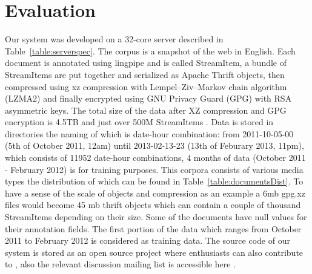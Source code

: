 
\section{Evaluation}
\label{sec:results}

 Our system was developed on a 32-core server described in Table~\ref{table:serverspec}. The corpus is a snapshot of the web in English. Each document is annotated using lingpipe and is called StreamItem, a bundle of StreamItems are put together and serialized as Apache Thrift objects, then compressed using xz compression with Lempel–Ziv–Markov chain algorithm (LZMA2) and finally encrypted using GNU Privacy Guard (GPG) with RSA asymmetric keys. The total size of the data after XZ compression and GPG encryption is 4.5TB and just over 500M StreamItems \cite{s3}. Data is stored in directories the naming of which is date-hour combination: from 2011-10-05-00 (5th of October 2011, 12am) until 2013-02-13-23 (13th of Feburary 2013, 11pm), which consists of 11952 date-hour combinations, 4 months of data (October 2011 - February 2012) is for training purposes. This corpora consists of various media types the distribution of which can be found in Table~\ref{table:documentsDist}. To have a sense of the scale of objects and compression as an example a 6mb gpg.xz files would become 45 mb thrift objects which can contain a couple of thousand StreamItems depending on their size. Some of the documents have null values for their annotation fields. The first portion of the data which ranges from October 2011 to February 2012 is considered as training data. The source code of our system is stored as an open source project where enthusiasts can also contribute to \cite{github}, also the relevant discussion mailing list is accessible here \cite{googlegroups}.
 
